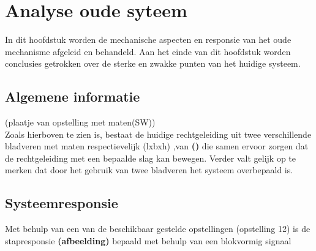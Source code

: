 \documentclass[a4paper]{article}
\begin{document}
\section{Analyse oude syteem}
In dit hoofdstuk worden de mechanische aspecten en responsie van het oude mechanisme afgeleid en behandeld. Aan het einde van dit hoofdstuk worden conclusies getrokken over de sterke en zwakke punten van het huidige systeem.

\subsection{Algemene informatie}
(plaatje van opstelling met maten(SW)) \\
Zoals hierboven te zien is, bestaat de huidige rechtgeleiding uit twee verschillende bladveren met maten respectievelijk (lxbxh) ,van \textbf{()} die samen ervoor zorgen dat de rechtgeleiding met een bepaalde slag kan bewegen. Verder valt gelijk op te merken dat door het gebruik van twee bladveren het systeem overbepaald is.

\subsection{Systeemresponsie}
Met behulp van een van de beschikbaar gestelde opstellingen (opstelling 12) is de stapresponsie \textbf{(afbeelding)} bepaald met behulp van een blokvormig signaal

\end{document}
